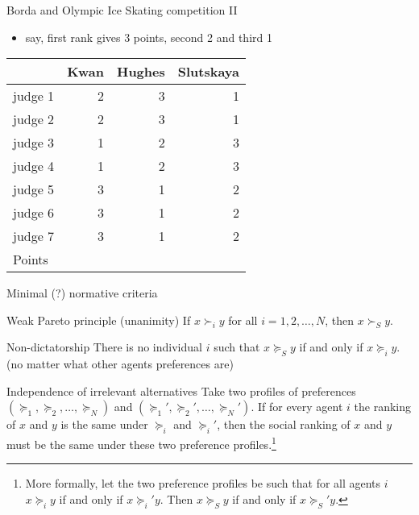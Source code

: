 \documentclass[bigger]{beamer}
\begin{document}
\begin{frame}[label={sec:org1f7819e}]{Borda and Olympic Ice Skating  competition II}
\begin{itemize}
\item say, first rank gives 3 points, second 2 and third 1
\end{itemize}
\begin{center}
\begin{tabular}{l|rrr}
 & Kwan & Hughes & Slutskaya\\
\hline
judge 1 & 2 & 3 & 1\\
judge 2 & 2 & 3 & 1\\
judge 3 & 1 & 2 & 3\\
judge 4 & 1 & 2 & 3\\
judge 5 & 3 & 1 & 2\\
judge 6 & 3 & 1 & 2\\
judge 7 & 3 & 1 & 2\\
\hline
Points &  &  & \\
\end{tabular}
\end{center}
\end{frame}

\begin{frame}[label={sec:org35f6974}]{Minimal (?) normative criteria}
\begin{block}{Weak Pareto principle (unanimity)}
If \(x\succ_i y\) for all \(i=1,2,\dots,N\), then \(x\succ_S y\).
\end{block}
\begin{block}{Non-dictatorship}
There is no individual \(i\) such that \(x\succeq_S y\) if and only if \(x\succeq_i y\). (no matter what other agents preferences are)
\end{block}
\begin{block}{Independence of irrelevant alternatives}
Take two profiles of preferences \((\succeq_1,\succeq_2,\dots,\succeq_N)\) and \((\succeq_1',\succeq_2',\dots,\succeq_N')\). If for every agent \(i\) the ranking of \(x\) and \(y\) is the same under \(\succeq_i\) and \(\succeq_i'\), then the social ranking of \(x\) and \(y\) must be the same under these two preference profiles.\footnote{More formally, let the two preference profiles be such that for all agents $i$ $x\succeq_i y$ if and only if $x\succeq_i' y$. Then $x\succeq_S y$ if and only if $x \succeq_S' y$.}
\end{block}
\end{frame}
\end{document}
